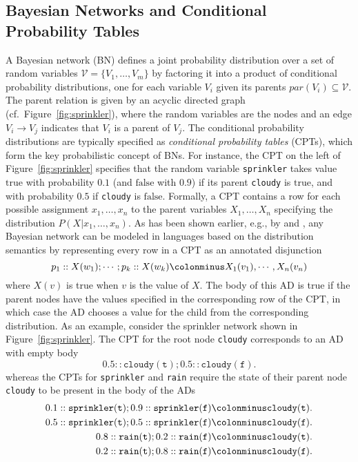 \documentclass[a4paper]{article}
\newcommand{\true}{\ensuremath{\mathrm{true}}}
\newcommand{\false}{\ensuremath{\mathrm{false}}}
\begin{document}
\subsection{Bayesian Networks and Conditional Probability Tables}
A Bayesian network (BN) defines a joint probability distribution over a set
of random variables $\mathcal{V} = \{V_1,\ldots,V_m\}$ by factoring it into a product
of conditional probability distributions, one for each variable $V_i$
given its parents $par(V_i)\subseteq\mathcal{V}$. The parent relation
is given by an acyclic directed graph (cf.~Figure~\ref{fig:sprinkler}), where the random variables are
the nodes and an edge $V_i\rightarrow V_j$ indicates that $V_i$ is a
parent of $V_j$. The conditional probability distributions are
typically specified as 
\emph{conditional probability tables} (CPTs), which form the key
probabilistic concept of BNs.  
For
instance, the CPT on the left of Figure~\ref{fig:sprinkler} specifies
that the random variable \verb|sprinkler| takes value $\true$ with
probability $0.1$ (and $\false$ with $0.9$) if its parent \verb|cloudy| is $\true$, and with
probability $0.5$ if \verb|cloudy| is $\false$. 
Formally, a CPT
contains a row for each possible assignment $x_1,\ldots, x_n$ to the
parent variables $X_1,\ldots, X_n$ 
specifying the distribution $P( X |
x_1,\ldots,x_n)$. As has been shown earlier, e.g., by \cite{Poole:93}
and \cite{Vennekens04}, any Bayesian network can be modeled  in
languages based on the distribution semantics by representing  
 every row in a CPT 
as an annotated disjunction
\begin{equation*}
p_1::X(w_1); \cdots; p_k::X(w_k) \colonminus X_1(v_1), \cdots, X_n(v_n)
\end{equation*}
where $X(v)$ is true when $v$ is the value of $X$. The body of this AD
is true if the parent nodes have the values specified in the
corresponding row of the CPT, in which case the AD chooses a value for
the child from the corresponding distribution. As an example,
consider the sprinkler network shown in Figure~\ref{fig:sprinkler}. The CPT for the root node
\texttt{cloudy} corresponds to an AD with empty body
\begin{equation*}
0.5::\mathtt{cloudy(t)} ; 0.5::\mathtt{cloudy(f)}.
\end{equation*}
whereas the CPTs for \texttt{sprinkler} and \texttt{rain} require the
state of their parent node \texttt{cloudy} to be present in the body
of the ADs
\begin{align*}
0.1::\mathtt{sprinkler(t)} ; 0.9::\mathtt{sprinkler(f)}  &\colonminus \mathtt{cloudy(t)}.\\
0.5::\mathtt{sprinkler(t)} ; 0.5::\mathtt{sprinkler(f)}  &\colonminus \mathtt{cloudy(f)}.\\
0.8::\mathtt{rain(t)} ; 0.2::\mathtt{rain(f)} &\colonminus \mathtt{cloudy(t)}.\\
0.2::\mathtt{rain(t)} ; 0.8::\mathtt{rain(f)} &\colonminus \mathtt{cloudy(f)}.\\
\end{align*}
\end{document}
